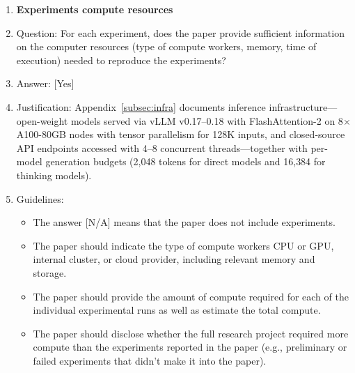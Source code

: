 \documentclass{llmxive}
\providecommand{\answerYes}[1][]{[Yes]#1}
\providecommand{\answerNA}[1][]{[N/A]#1}
\begin{document}
\begin{enumerate}
\item {\bf Experiments compute resources}
    \item[] Question: For each experiment, does the paper provide sufficient information on the computer resources (type of compute workers, memory, time of execution) needed to reproduce the experiments?
    \item[] Answer: \answerYes{}
    \item[] Justification: Appendix~\ref{subsec:infra} documents inference infrastructure---open-weight models served via vLLM v0.17--0.18 with FlashAttention-2 on 8$\times$A100-80GB nodes with tensor parallelism for 128K inputs, and closed-source API endpoints accessed with 4--8 concurrent threads---together with per-model generation budgets (2{,}048 tokens for direct models and 16{,}384 for thinking models).
    \item[] Guidelines:
    \begin{itemize}
        \item The answer \answerNA{} means that the paper does not include experiments.
        \item The paper should indicate the type of compute workers CPU or GPU, internal cluster, or cloud provider, including relevant memory and storage.
        \item The paper should provide the amount of compute required for each of the individual experimental runs as well as estimate the total compute.
        \item The paper should disclose whether the full research project required more compute than the experiments reported in the paper (e.g., preliminary or failed experiments that didn't make it into the paper).
    \end{itemize}


\end{enumerate}
\end{document}
